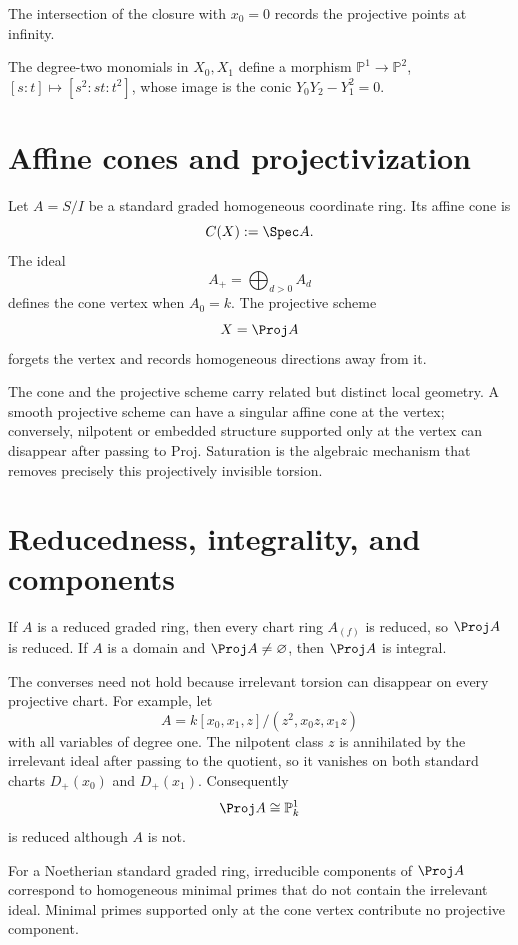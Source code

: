 The intersection of the closure with \(x_0=0\) records the projective points at infinity.



\begin{example}\label{ex:vi37-expand-03}
The degree-two monomials in $X_0,X_1$ define a morphism $\mathbb P^1\to\mathbb P^2$, $[s:t]\mapsto[s^2:st:t^2]$, whose image is the conic $Y_0Y_2-Y_1^2=0$.
\end{example}
\section{Affine cones and projectivization}
Let \(A=S/I\) be a standard graded homogeneous coordinate ring.  Its affine cone is
\[
  C(X):=\Spec A.
\]
The ideal
\[
  A_+=\bigoplus_{d>0}A_d
\]
defines the cone vertex when \(A_0=k\).  The projective scheme
\[
  X=\Proj A
\]
forgets the vertex and records homogeneous directions away from it.

The cone and the projective scheme carry related but distinct local geometry.  A smooth projective scheme can have a singular affine cone at the vertex; conversely, nilpotent or embedded structure supported only at the vertex can disappear after passing to Proj.  Saturation is the algebraic mechanism that removes precisely this projectively invisible torsion.



\section{Reducedness, integrality, and components}
If \(A\) is a reduced graded ring, then every chart ring \(A_{(f)}\) is reduced, so \(\Proj A\) is reduced.  If \(A\) is a domain and \(\Proj A\ne\varnothing\), then \(\Proj A\) is integral.

The converses need not hold because irrelevant torsion can disappear on every projective chart.  For example, let
\[
  A=k[x_0,x_1,z]/(z^2,x_0z,x_1z)
\]
with all variables of degree one.  The nilpotent class \(z\) is annihilated by the irrelevant ideal after passing to the quotient, so it vanishes on both standard charts \(D_+(x_0)\) and \(D_+(x_1)\).  Consequently
\[
  \Proj A\cong\mathbb P^1_k
\]
is reduced although \(A\) is not.

For a Noetherian standard graded ring, irreducible components of \(\Proj A\) correspond to homogeneous minimal primes that do not contain the irrelevant ideal.  Minimal primes supported only at the cone vertex contribute no projective component.

